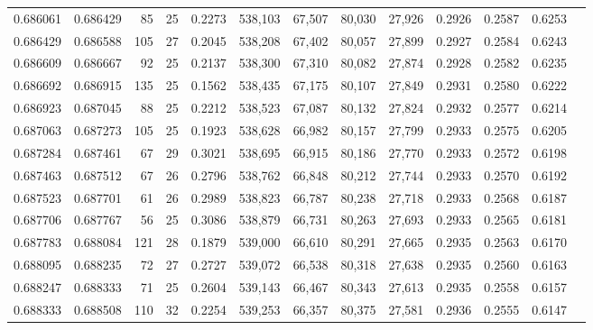 \begin{tabular}{rrrrrrrrrrrrr}
0.686061 & 0.686429 &     85 &    25 &                                     0.2273 & 538,103 &  67,507 &  80,030 &  27,926 & 0.2926 & 0.2587 & 0.6253 \\
0.686429 & 0.686588 &    105 &    27 &                                     0.2045 & 538,208 &  67,402 &  80,057 &  27,899 & 0.2927 & 0.2584 & 0.6243 \\
0.686609 & 0.686667 &     92 &    25 &                                     0.2137 & 538,300 &  67,310 &  80,082 &  27,874 & 0.2928 & 0.2582 & 0.6235 \\
0.686692 & 0.686915 &    135 &    25 &                                     0.1562 & 538,435 &  67,175 &  80,107 &  27,849 & 0.2931 & 0.2580 & 0.6222 \\
0.686923 & 0.687045 &     88 &    25 &                                     0.2212 & 538,523 &  67,087 &  80,132 &  27,824 & 0.2932 & 0.2577 & 0.6214 \\
0.687063 & 0.687273 &    105 &    25 &                                     0.1923 & 538,628 &  66,982 &  80,157 &  27,799 & 0.2933 & 0.2575 & 0.6205 \\
0.687284 & 0.687461 &     67 &    29 &                                     0.3021 & 538,695 &  66,915 &  80,186 &  27,770 & 0.2933 & 0.2572 & 0.6198 \\
0.687463 & 0.687512 &     67 &    26 &                                     0.2796 & 538,762 &  66,848 &  80,212 &  27,744 & 0.2933 & 0.2570 & 0.6192 \\
0.687523 & 0.687701 &     61 &    26 &                                     0.2989 & 538,823 &  66,787 &  80,238 &  27,718 & 0.2933 & 0.2568 & 0.6187 \\
0.687706 & 0.687767 &     56 &    25 &                                     0.3086 & 538,879 &  66,731 &  80,263 &  27,693 & 0.2933 & 0.2565 & 0.6181 \\
0.687783 & 0.688084 &    121 &    28 &                                     0.1879 & 539,000 &  66,610 &  80,291 &  27,665 & 0.2935 & 0.2563 & 0.6170 \\
0.688095 & 0.688235 &     72 &    27 &                                     0.2727 & 539,072 &  66,538 &  80,318 &  27,638 & 0.2935 & 0.2560 & 0.6163 \\
0.688247 & 0.688333 &     71 &    25 &                                     0.2604 & 539,143 &  66,467 &  80,343 &  27,613 & 0.2935 & 0.2558 & 0.6157 \\
0.688333 & 0.688508 &    110 &    32 &                                     0.2254 & 539,253 &  66,357 &  80,375 &  27,581 & 0.2936 & 0.2555 & 0.6147 \\

\end{tabular}
